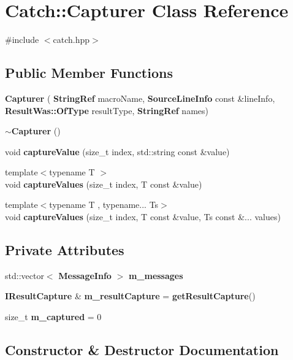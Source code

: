 \section{Catch\+::Capturer Class Reference}
\label{class_catch_1_1_capturer}


{\ttfamily \#include $<$catch.\+hpp$>$}

\subsection*{Public Member Functions}
\begin{DoxyCompactItemize}
\item 
\textbf{ Capturer} (\textbf{ String\+Ref} macro\+Name, \textbf{ Source\+Line\+Info} const \&line\+Info, \textbf{ Result\+Was\+::\+Of\+Type} result\+Type, \textbf{ String\+Ref} names)
\item 
\textbf{ $\sim$\+Capturer} ()
\item 
void \textbf{ capture\+Value} (size\+\_\+t index, std\+::string const \&value)
\item 
{\footnotesize template$<$typename T $>$ }\\void \textbf{ capture\+Values} (size\+\_\+t index, T const \&value)
\item 
{\footnotesize template$<$typename T , typename... Ts$>$ }\\void \textbf{ capture\+Values} (size\+\_\+t index, T const \&value, Ts const \&... values)
\end{DoxyCompactItemize}
\subsection*{Private Attributes}
\begin{DoxyCompactItemize}
\item 
std\+::vector$<$ \textbf{ Message\+Info} $>$ \textbf{ m\+\_\+messages}
\item 
\textbf{ I\+Result\+Capture} \& \textbf{ m\+\_\+result\+Capture} = \textbf{ get\+Result\+Capture}()
\item 
size\+\_\+t \textbf{ m\+\_\+captured} = 0
\end{DoxyCompactItemize}


\subsection{Constructor \& Destructor Documentation}
\mbox{\label{class_catch_1_1_capturer_a86b0b27acc803a4e1310c10820f3038f}} 
